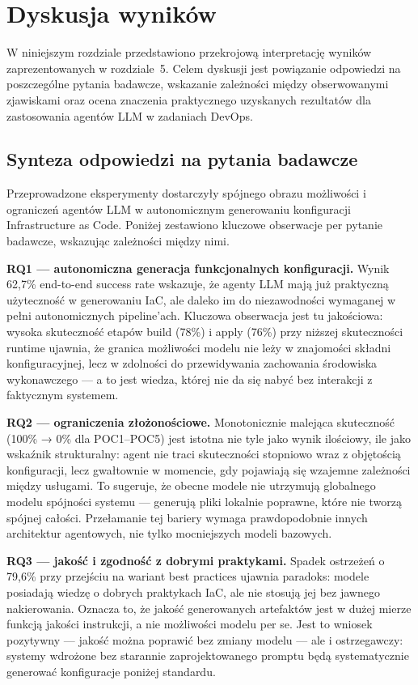 \clearpage %
\section{Dyskusja wyników}

W niniejszym rozdziale przedstawiono przekrojową interpretację wyników zaprezentowanych w rozdziale~5. Celem dyskusji jest powiązanie odpowiedzi na poszczególne pytania badawcze, wskazanie zależności między obserwowanymi zjawiskami oraz ocena znaczenia praktycznego uzyskanych rezultatów dla zastosowania agentów LLM w zadaniach DevOps.

\subsection{Synteza odpowiedzi na pytania badawcze}

Przeprowadzone eksperymenty dostarczyły spójnego obrazu możliwości i ograniczeń agentów LLM w autonomicznym generowaniu konfiguracji Infrastructure as Code. Poniżej zestawiono kluczowe obserwacje per pytanie badawcze, wskazując zależności między nimi.

\textbf{RQ1 — autonomiczna generacja funkcjonalnych konfiguracji.} Wynik 62{,}7\% end-to-end success rate wskazuje, że agenty LLM mają już praktyczną użyteczność w generowaniu IaC, ale daleko im do niezawodności wymaganej w pełni autonomicznych pipeline'ach. Kluczowa obserwacja jest tu jakościowa: wysoka skuteczność etapów build (78\%) i apply (76\%) przy niższej skuteczności runtime ujawnia, że granica możliwości modelu nie leży w znajomości składni konfiguracyjnej, lecz w zdolności do przewidywania zachowania środowiska wykonawczego — a to jest wiedza, której nie da się nabyć bez interakcji z faktycznym systemem.

\textbf{RQ2 — ograniczenia złożonościowe.} Monotonicznie malejąca skuteczność (100\% → 0\% dla POC1--POC5) jest istotna nie tyle jako wynik ilościowy, ile jako wskaźnik strukturalny: agent nie traci skuteczności stopniowo wraz z objętością konfiguracji, lecz gwałtownie w momencie, gdy pojawiają się wzajemne zależności między usługami. To sugeruje, że obecne modele nie utrzymują globalnego modelu spójności systemu — generują pliki lokalnie poprawne, które nie tworzą spójnej całości. Przełamanie tej bariery wymaga prawdopodobnie innych architektur agentowych, nie tylko mocniejszych modeli bazowych.

\textbf{RQ3 — jakość i zgodność z dobrymi praktykami.} Spadek ostrzeżeń o 79{,}6\% przy przejściu na wariant best practices ujawnia paradoks: modele posiadają wiedzę o dobrych praktykach IaC, ale nie stosują jej bez jawnego nakierowania. Oznacza to, że jakość generowanych artefaktów jest w dużej mierze funkcją jakości instrukcji, a nie możliwości modelu per se. Jest to wniosek pozytywny — jakość można poprawić bez zmiany modelu — ale i ostrzegawczy: systemy wdrożone bez starannie zaprojektowanego promptu będą systematycznie generować konfiguracje poniżej standardu.

